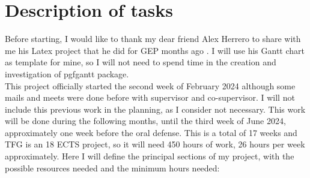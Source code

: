 \chapter{Description of tasks}
Before starting, I would like to thank my dear friend Alex Herrero to share with me his Latex project that he did for GEP months ago \cite{TFGALex}.
I will use his Gantt chart as template for mine, so I will not need to spend time in the creation and investigation of pgfgantt package. \\

This project officially started the second week of February 2024 although some mails and meets were done before with supervisor and co-supervisor.
I will not include this previous work in the planning, as I consider not necessary.
This work will be done during the following months, until the third week of June 2024, approximately one week before the oral defense.
This is a total of 17 weeks and TFG is an 18 ECTS project, so it will need 450 hours of work, 26 hours per week approximately.
Here I will define the principal sections of my project, with the possible resources needed and the minimum hours needed:

